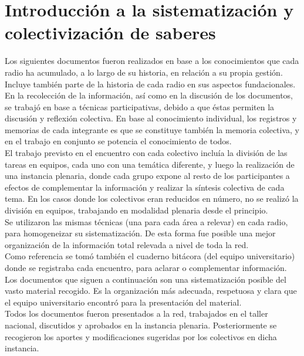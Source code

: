 \chapter{Introducción a la sistematización y colectivización de saberes}

Los siguientes documentos fueron realizados en base a los conocimientos que cada radio ha acumulado, a lo largo de su historia, en relación a su propia gestión. Incluye también parte de la historia de cada radio en sus aspectos fundacionales.\\

En la recolección de la información, así como en la discusión de los documentos, se trabajó en base a técnicas participativas, debido a que éstas permiten la discusión y reflexión colectiva. En base al conocimiento individual, los registros y memorias de cada integrante es que se constituye también la memoria colectiva, y en el trabajo en conjunto se potencia el conocimiento de todos.\\

El trabajo previsto en el encuentro con cada colectivo incluía la división de las tareas en equipos, cada uno con una temática diferente, y luego la realización de una instancia plenaria, donde cada grupo expone al resto de los participantes a efectos de complementar la información y realizar la síntesis colectiva de cada tema. En los casos donde los colectivos eran reducidos en número, no se realizó la división en equipos, trabajando en modalidad plenaria desde el principio.\\

Se utilizaron las mismas técnicas (una para cada área a relevar) en cada radio, para homogeneizar su sistematización. De esta forma fue posible una mejor organización de la información total relevada a nivel de toda la red.\\

Como referencia se tomó también el cuaderno bitácora (del equipo universitario) donde se registraba cada encuentro, para aclarar o complementar información.\\

Los documentos que siguen a continuación son una sistematización posible del vasto material recogido. Es la organización más adecuada, respetuosa y clara que el equipo universitario encontró para la presentación del material.\\

Todos los documentos fueron presentados a la red, trabajados en el taller nacional, discutidos y aprobados en la instancia plenaria. Posteriormente se recogieron los aportes y modificaciones sugeridas por los colectivos en dicha instancia.